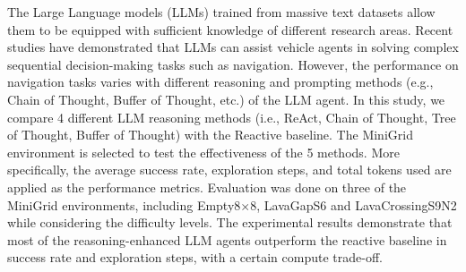 The Large Language models (LLMs) trained from massive text datasets allow them to be equipped with sufficient knowledge of different research areas. Recent studies have demonstrated that LLMs can assist vehicle agents in solving complex sequential decision-making tasks such as navigation. However, the performance on navigation tasks varies with different reasoning and prompting methods (e.g., Chain of Thought, Buffer of Thought, etc.) of the LLM agent. In this study, we compare 4 different LLM reasoning methods (i.e., ReAct, Chain of Thought, Tree of Thought, Buffer of Thought) with the Reactive baseline. The MiniGrid environment is selected to test the effectiveness of the 5 methods. More specifically, the average success rate, exploration steps, and total tokens used are applied as the performance metrics. Evaluation was done on three of the MiniGrid environments, including {\selectfont Empty8$\times$8}, {\selectfont LavaGapS6} and {\selectfont LavaCrossingS9N2} while considering the difficulty levels. The experimental results demonstrate that most of the reasoning-enhanced LLM agents outperform the reactive baseline in success rate and exploration steps, with a certain compute trade-off.